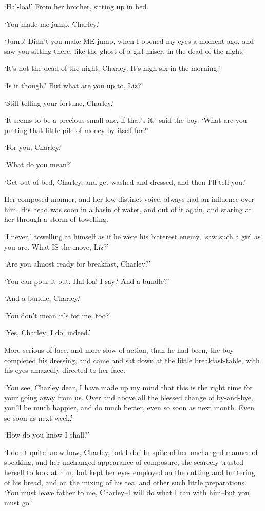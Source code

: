‘Hal-loa!’ From her brother, sitting up in bed.

‘You made me jump, Charley.’

‘Jump! Didn’t you make ME jump, when I opened my eyes a moment ago, and
saw you sitting there, like the ghost of a girl miser, in the dead of
the night.’

‘It’s not the dead of the night, Charley. It’s nigh six in the morning.’

‘Is it though? But what are you up to, Liz?’

‘Still telling your fortune, Charley.’

‘It seems to be a precious small one, if that’s it,’ said the boy. ‘What
are you putting that little pile of money by itself for?’

‘For you, Charley.’

‘What do you mean?’

‘Get out of bed, Charley, and get washed and dressed, and then I’ll tell
you.’

Her composed manner, and her low distinct voice, always had an influence
over him. His head was soon in a basin of water, and out of it again,
and staring at her through a storm of towelling.

‘I never,’ towelling at himself as if he were his bitterest enemy, ‘saw
such a girl as you are. What IS the move, Liz?’

‘Are you almost ready for breakfast, Charley?’

‘You can pour it out. Hal-loa! I say? And a bundle?’

‘And a bundle, Charley.’

‘You don’t mean it’s for me, too?’

‘Yes, Charley; I do; indeed.’

More serious of face, and more slow of action, than he had been, the
boy completed his dressing, and came and sat down at the little
breakfast-table, with his eyes amazedly directed to her face.

‘You see, Charley dear, I have made up my mind that this is the right
time for your going away from us. Over and above all the blessed change
of by-and-bye, you’ll be much happier, and do much better, even so soon
as next month. Even so soon as next week.’

‘How do you know I shall?’

‘I don’t quite know how, Charley, but I do.’ In spite of her unchanged
manner of speaking, and her unchanged appearance of composure, she
scarcely trusted herself to look at him, but kept her eyes employed on
the cutting and buttering of his bread, and on the mixing of his tea,
and other such little preparations. ‘You must leave father to me,
Charley--I will do what I can with him--but you must go.’

